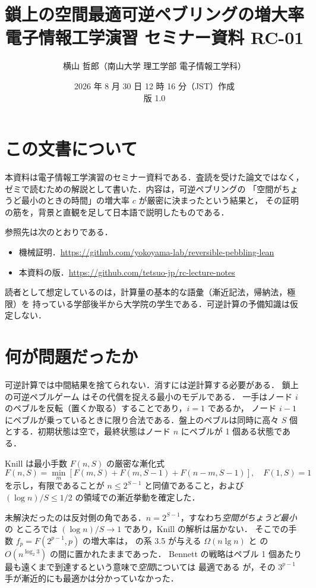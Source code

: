\documentclass[a4paper,11pt]{jsarticle}
\title{鎖上の空間最適可逆ペブリングの増大率\\
\large 電子情報工学演習 セミナー資料 RC-01}
\author{横山 哲郎（南山大学 理工学部 電子情報工学科）}
\date{2026 年 8 月 30 日 12 時 16 分（JST）作成\\版 1.0}
\begin{document}
\maketitle

\section{この文書について}
本資料は電子情報工学演習のセミナー資料である．査読を受けた論文ではなく，
ゼミで読むための解説として書いた．内容は，可逆ペブリングの
「空間がちょうど最小のときの時間」の増大率 $c$ が厳密に決まったという結果と，
その証明の筋を，背景と直観を足して日本語で説明したものである．

参照先は次のとおりである．
\begin{itemize}
\setlength{\itemsep}{0pt}
\item 機械証明．\url{https://github.com/yokoyama-lab/reversible-pebbling-lean}
\item 本資料の版．\url{https://github.com/tetsuo-jp/rc-lecture-notes}
\end{itemize}

読者として想定しているのは，計算量の基本的な語彙（漸近記法，帰納法，極限）を
持っている学部後半から大学院の学生である．可逆計算の予備知識は仮定しない．

\section{何が問題だったか}
可逆計算では中間結果を捨てられない．消すには逆計算する必要がある．
鎖上の可逆ペブルゲーム \cite{Benn89} はその代償を捉える最小のモデルである．
一手はノード $i$ のペブルを反転（置くか取る）することであり，$i = 1$ であるか，
ノード $i-1$ にペブルが乗っているときに限り合法である．盤上のペブルは同時に高々
$S$ 個とする．初期状態は空で，最終状態はノード $n$ にペブルが 1 個ある状態である．

Knill \cite{Knill95} は最小手数 $F(n,S)$ の厳密な漸化式
\begin{equation}
F(n,S) = \min_m [F(m,S) + F(m,S{-}1) + F(n{-}m,S{-}1)], \quad F(1,S)=1
\label{eq:knill}
\end{equation}
を示し，有限であることが $n \le 2^{S-1}$ と同値であること，および
$(\log n)/S \le 1/2$ の領域での漸近挙動を確定した．

未解決だったのは反対側の角である．$n = 2^{S-1}$，すなわち\emph{空間がちょうど最小}の
ところでは $(\log n)/S \to 1$ であり，Knill の解析は届かない．
そこでの手数 $f_p = F(2^{p-1},p)$ の増大率は，
\cite{Kral04} の系 3.5 が与える $\Omega(n\lg n)$ と \cite{LiVi96a} の
$O(n^{\log_2 3})$ の間に置かれたままであった．
Bennett の戦略はペブル 1 個あたり最も遠くまで到達するという意味で\emph{空間}については
最適である \cite{LiTV98} が，その $3^{p-1}$ 手が漸近的にも最適かは分かっていなかった．
\end{document}
